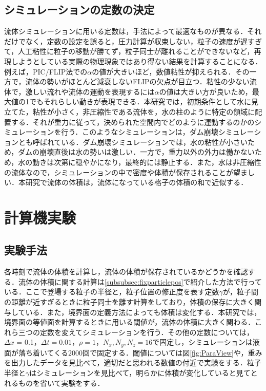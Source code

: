 \documentclass[a4j,12pt]{jreport}
\begin{document}
\section{シミュレーションの定数の決定} \label{sec:constant}
流体シミュレーションに用いる定数は，手法によって最適なものが異なる．それだけでなく，定数の設定を誤ると，圧力計算が収束しない，粒子の速度が遅すぎて，人工粘性に粒子の移動が勝てず，粒子同士が離れることができないなど，再現しようとしている実際の物理現象ではあり得ない結果を計算することになる．例えば，PIC/FLIP法での$\alpha$の値が大きいほど，数値粘性が抑えられる．その一方で，流体の勢いがほとんど減衰しないFLIPの欠点が目立つ．粘性の少ない流体で，激しい流れや流体の運動を表現するには$\alpha$の値は大きい方が良いため，最大値の1でもそれらしい動きが表現できる．本研究では，初期条件として水に見立てた，粘性が小さく，非圧縮性である流体を，水の柱のように特定の領域に配置する．それが重力に従って，決められた空間内でどのように運動するのかのシミュレーションを行う．このようなシミュレーションは，ダム崩壊シミュレーションとも呼ばれている．ダム崩壊シミュレーションでは，水の粘性が小さいため，ダムの崩壊直後は水の勢いは激しい．一方で，重力以外の外力は働かないため，水の動きは次第に穏やかになり，最終的には静止する．また，水は非圧縮性の流体なので，シミュレーションの中で密度や体積が保存されることが望ましい．本研究で流体の体積は，流体になっている格子の体積の和で近似する．

\chapter{計算機実験} \label{chapter:5}
\section{実験手法} \label{sec:exp_method}
各時刻で流体の体積を計算し，流体の体積が保存されているかどうかを確認する．流体の体積に関する計算は\ref{subsubsec:fixparticlepos}で紹介した方法で行っている．ここで登場する粒子の半径と，粒子位置の修正度を表す定数$\gamma$が，粒子間の距離が近すぎるときに粒子同士を離す計算をしており，体積の保存に大きく関与している．また，境界面の定義方法によっても体積は変化する．本研究では，境界面の等値面を計算するときに用いる閾値が，流体の体積に大きく関わる．これら三つの定数を変えてシミュレーションを行う．その他の定数については，$\varDelta x$ = 0.1，$\varDelta t = 0.01$，$\rho = 1$，$N_x,N_y,N_z = 16$で固定し，シミュレーションは液面が落ち着いてくる$2000回$で固定する．閾値については図\ref{fig:ParaView}や，重みを出力したデータを見比べて，適切だと思われる数値の付近で実験をする．粒子半径と$\gamma$はシミュレーションを見比べて，明らかに体積が変化していると見てとれるものを省いて実験をする．
\end{document}
